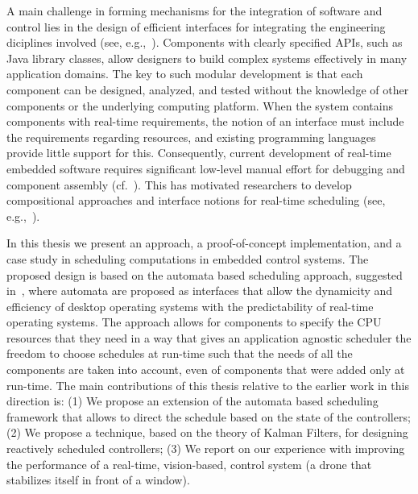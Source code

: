 \documentclass[ twoside, 12pt ]{article}
\begin{document}
A main challenge in forming mechanisms for the integration of software and control lies in the design of efficient interfaces for integrating the engineering diciplines involved (see, e.g.,~\cite{weiss2007automata}). Components with clearly specified APIs, such as Java library classes, allow designers to build
complex systems effectively in many application domains.  The key to such modular development is
that each component can be designed, analyzed, and tested without the knowledge of other
components or the underlying computing platform. When the system contains components with
real-time requirements, the notion of an interface must include the requirements regarding
resources, and existing programming languages provide little support for this.  Consequently,
current development of real-time embedded software requires significant low-level manual effort for
debugging and component assembly (cf.~\cite{Lee00,IEEE03,HS06}). This has motivated 
researchers to develop compositional approaches and interface notions for real-time scheduling (see, e.g.,~\cite{RS01,dH01,MF01,CAHS03,SL08,SLBS04,TWS06,DBLP:conf/lctrts/AuerbachBIKRRT07}).

In this thesis we present an approach, a proof-of-concept implementation, and a case study in scheduling computations in embedded control systems. The proposed design is based on the automata based scheduling approach, suggested in~\cite{weiss2007automata,RTComposer,AW08,ESNAASHARI20102410,liu2013synthesis}, where automata are proposed as interfaces that allow the dynamicity and efficiency of desktop operating systems with the predictability of real-time operating systems. The approach allows for components to specify the CPU resources that they need in a way that gives an application agnostic scheduler the freedom to choose schedules at run-time such that the needs of all the components are taken into account, even of components that were added only at run-time. The main contributions of this thesis relative to the earlier work in this direction is:
(1) We propose an extension of the automata based scheduling framework that allows to direct the schedule based on the state of the controllers; (2) We propose a technique, based on the theory of Kalman Filters, for designing reactively scheduled controllers; (3) We report on our experience with improving the performance of a real-time, vision-based, control system (a drone that stabilizes itself in front of a window).

\end{document}
